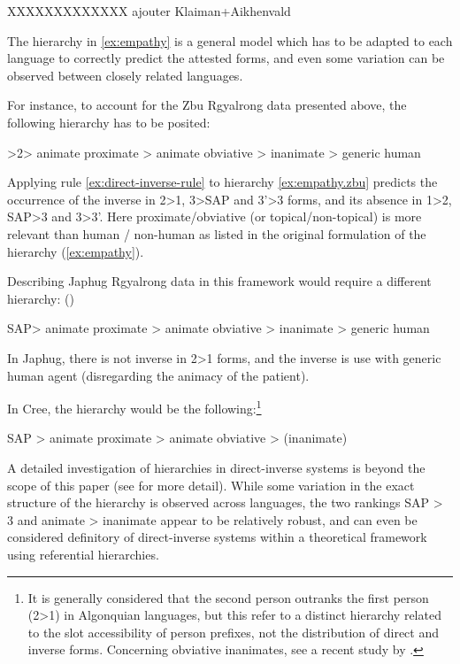 \documentclass[twoside,a4paper,11pt]{article}
\begin{document}
XXXXXXXXXXXXX ajouter Klaiman+Aikhenvald

The hierarchy in \ref{ex:empathy}  is  a general model which has to be adapted to each language to correctly predict the attested forms, and even some variation can be observed between closely related languages.


For instance, to account for the Zbu Rgyalrong data presented above, the following hierarchy has to be posited:

\begin{exe}
\ex \label{ex:empathy.zbu}
 >2> animate proximate > animate obviative > inanimate > generic human
\end{exe}
Applying rule \ref{ex:direct-inverse-rule} to hierarchy \ref{ex:empathy.zbu} predicts the occurrence of the inverse in 2>1, 3>SAP and 3'>3 forms, and its absence in 1>2, SAP>3 and 3>3'. Here proximate/obviative (or topical/non-topical) is more relevant than human / non-human as listed in the original formulation of the hierarchy (\ref{ex:empathy}).

Describing Japhug Rgyalrong data in this framework would require a different hierarchy: (\citealt{jacques12demotion})

\begin{exe}
\ex \label{ex:empathy.japhug}
\glt SAP> animate proximate > animate obviative > inanimate > generic human
\end{exe}

In Japhug, there is not inverse in 2>1 forms, and the inverse is use with generic human agent (disregarding the animacy of the patient).

In Cree, the hierarchy would be the following:\footnote{It is generally considered that the second person outranks the first person (2>1) in Algonquian languages, but this refer to a distinct hierarchy related to the slot accessibility of person prefixes, not the distribution of direct and inverse forms. Concerning obviative inanimates, see a recent study by \citet{muehlbauer12obviation}.}
\begin{exe}
\ex \label{ex:empathy.cree}
\glt SAP > animate proximate > animate obviative > (inanimate)
\end{exe}

A detailed investigation of hierarchies in direct-inverse systems is beyond the scope of this paper (see \citealt{zuniga06} for more detail). While some variation in the exact structure of the hierarchy is observed across languages, the two rankings SAP > 3 and animate > inanimate appear to be relatively robust, and can even be considered definitory of direct-inverse systems within a theoretical framework using referential hierarchies.
\end{document}
